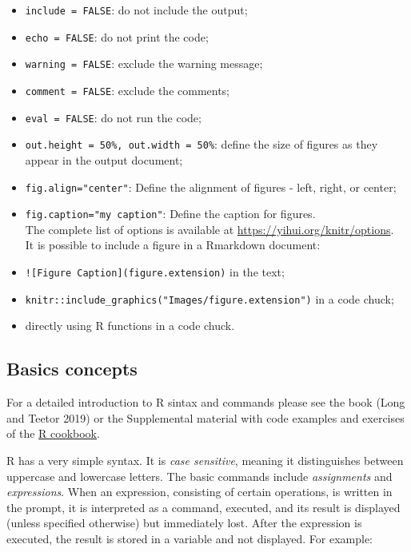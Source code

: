 \documentclass[
]{article}
\begin{document}
\begin{itemize}
\item
  \texttt{include\ =\ FALSE}: do not include the output;
\item
  \texttt{echo\ =\ FALSE}: do not print the code;
\item
  \texttt{warning\ =\ FALSE}: exclude the warning message;
\item
  \texttt{comment\ =\ FALSE}: exclude the comments;
\item
  \texttt{eval\ =\ FALSE}: do not run the code;
\item
  \texttt{out.height\ =\ 50\%,\ out.width\ =\ 50\%}: define the size of
  figures as they appear in the output document;
\item
  \texttt{fig.align="center"}: Define the alignment of figures - left,
  right, or center;
\item
  \texttt{fig.caption="my\ caption"}: Define the caption for figures.\\
  The complete list of options is available at
  \url{https://yihui.org/knitr/options}.\\
  It is possible to include a figure in a Rmarkdown document:
\item
  \texttt{!{[}Figure\ Caption{]}(figure.extension)} in the text;
\item
  \texttt{knitr::include\_graphics("Images/figure.extension")} in a code
  chuck;
\item
  directly using R functions in a code chuck.
\end{itemize}

\hypertarget{basics-concepts}{%
\subsection{Basics concepts}\label{basics-concepts}}

For a detailed introduction to R sintax and commands please see the book
(Long and Teetor 2019) or the Supplemental material with code examples
and exercises of the \href{https://rc2e.com/}{R cookbook}.

R has a very simple syntax. It is \emph{case sensitive}, meaning it
distinguishes between uppercase and lowercase letters. The basic
commands include \emph{assignments} and \emph{expressions}. When an
expression, consisting of certain operations, is written in the prompt,
it is interpreted as a command, executed, and its result is displayed
(unless specified otherwise) but immediately lost. After the expression
is executed, the result is stored in a variable and not displayed. For
example:
\end{document}
